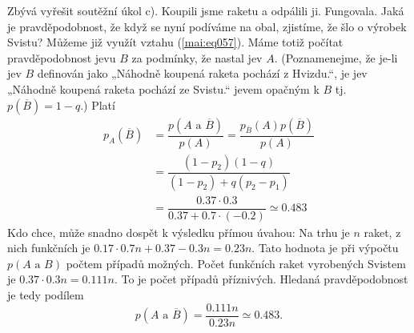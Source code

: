\begin{mdframed}[style=mdexam]
\begin{example}
      Zbývá vyřešit soutěžní úkol c). Koupili jsme raketu a odpálili ji. Fungovala. Jaká je
      pravděpodobnost, že když se nyní podíváme na obal, zjistíme, že šlo o výrobek Svistu? Můžeme
      již využít vztahu (\ref{mai:eq057}). Máme totiž počítat pravděpodobnost jevu \(B\) za
      podmínky, že nastal jev \(A\). (Poznamenejme, že je-li jev \(B\) definován jako „Náhodně
      koupená raketa pochází z Hvizdu.“, je jev „Náhodně koupená raketa pochází ze Svistu.“ jevem
      opačným k \(B\) tj. \(p(\overline{B})=1-q\).) Platí
      \begin{align*}
        p_A(\overline{B})&= \dfrac{p(A\text{ a }\overline{B})}{p(A)}
                          = \dfrac{p_{\overline{B}}(A)p(\overline{B})}{p(A)}                \\             
                         &= \dfrac{(1 - p_2)(1 - q)}{(1 - p_2) + q(p_2 - p_1)}              \\
                         &= \dfrac{\num{0.37}\cdot\num{0.3}}{\num{0.37} + \num{0.7}\cdot(\num{-0.2})}
                          \simeq\num{0.483}
      \end{align*}
      Kdo chce, může snadno dospět k výsledku přímou úvahou: Na trhu je \(n\) raket, z nich
      funkčních je \(\num{0.17}\cdot\num{0.7}n + \num{0.37} - \num{0.3}n = \num{0.23}n\). Tato
      hodnota je při výpočtu \(p(A\text{ a }B)\)  počtem případů možných. Počet funkčních raket
      vyrobených Svistem je \(\num{0.37}\cdot\num{0.3}n = \num{0.111}n\). To je počet případů
      příznivých. Hledaná pravděpodobnost je tedy podílem
      \begin{equation*}
        p(A\text{ a }\overline{B}) = \dfrac{\num{0.111}n}{\num{0.23}n}\simeq\num{0.483}.
      \end{equation*}
  \end{example}
\end{mdframed}